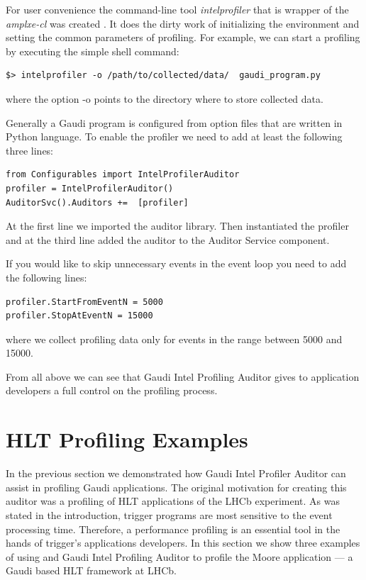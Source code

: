 \documentclass[a4paper]{jpconf}
\begin{document}
For user convenience the command-line tool {\it intelprofiler} that is wrapper of the {\it amplxe-cl} was created . 
It does the dirty work of initializing the environment and setting the common parameters of profiling. 
For example, we can start a profiling by executing the simple shell command:
\begin{verbatim}
$> intelprofiler -o /path/to/collected/data/  gaudi_program.py
\end{verbatim}
where the option -o points to the directory where to store collected data. 

Generally a Gaudi program is configured from option files that are written in Python language. 
To enable the profiler we need to add at least the following three lines:
\begin{verbatim}
from Configurables import IntelProfilerAuditor
profiler = IntelProfilerAuditor()
AuditorSvc().Auditors +=  [profiler]
\end{verbatim}

At the first line we imported the auditor library. Then instantiated the profiler and at the third line added the auditor 
to the Auditor Service component.

If you would like to skip unnecessary events in the event loop you need to add the following lines:
\begin{verbatim}
profiler.StartFromEventN = 5000 
profiler.StopAtEventN = 15000
\end{verbatim}
where we collect profiling data only for events in the range between 5000 and 15000.

From all above we can see that Gaudi Intel Profiling Auditor gives to application developers a full control on the
profiling process.


\section{HLT Profiling Examples}

In the previous section we demonstrated how Gaudi Intel Profiler Auditor can assist  in profiling Gaudi applications. 
The original motivation for creating this auditor was a profiling of HLT applications of the LHCb experiment. 
As was stated in the introduction, trigger programs are most sensitive to the event processing time. 
Therefore, a performance profiling is an essential tool in the hands of trigger's applications developers. 
In this section we show three examples of using \amp and Gaudi Intel Profiling Auditor to profile the Moore 
application --- a Gaudi based HLT framework at LHCb. 
\end{document}
